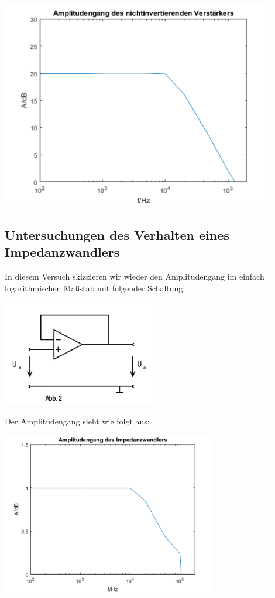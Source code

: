 \documentclass[11pt,a4paper,titlepage]{article}
\begin{document}
\begin{itemize}
\begin{center}
\includegraphics[width=0.9\textwidth]{4}
\end{center}
\end{itemize}
\newpage

\subsection{Untersuchungen des Verhalten eines Impedanzwandlers}
In diesem Versuch skizzieren wir wieder den Amplitudengang im einfach logarithmischen Ma\ss{}stab mit folgender Schaltung:
\begin{center}
\includegraphics[width=0.5\textwidth]{schalt-1-2}
\end{center}
Der Amplitudengang sieht wie folgt aus:
\begin{center}
\includegraphics[width=0.7\textwidth]{6}
\end{center}
\newpage
\end{document}
